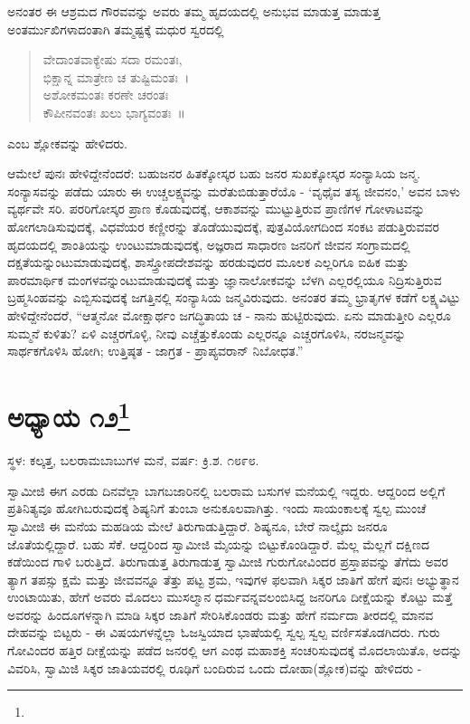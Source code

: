 ಅನಂತರ ಈ ಆಶ್ರಮದ ಗೌರವವನ್ನು ಅವರು ತಮ್ಮ ಹೃದಯದಲ್ಲಿ ಅನುಭವ ಮಾಡುತ್ತ ಮಾಡುತ್ತ ಅಂತರ್ಮುಖಿಗಳಾದಂತಾಗಿ ತಮ್ಮಷ್ಟಕ್ಕೆ ಮಧುರ ಸ್ವರದಲ್ಲಿ

\begin{verse}
ವೇದಾಂತವಾಕ್ಯೇಷು ಸದಾ ರಮಂತಃ,\\ಭಿಕ್ಷಾನ್ನ ಮಾತ್ರೇಣ ಚ ತುಷ್ಟಿಮಂತಃ~।\\ಅಶೋಕಮಂತಃ ಕರಣೇ ಚರಂತಃ\\ಕೌಪೀನವಂತಃ ಖಲು ಭಾಗ್ಯವಂತಃ~॥
\end{verse}

ಎಂಬ ಶ್ಲೋಕವನ್ನು ಹೇಳಿದರು.

ಆಮೇಲೆ ಪುನಃ ಹೇಳಿದ್ದೇನೆಂದರೆ: ಬಹುಜನರ ಹಿತಕ್ಕೋಸ್ಕರ ಬಹು ಜನರ ಸುಖಕ್ಕೋಸ್ಕರ ಸಂನ್ಯಾಸಿಯ ಜನ್ಮ. ಸಂನ್ಯಾಸವನ್ನು ಪಡೆದು ಯಾರು ಈ ಉಚ್ಚಲಕ್ಷ್ಯವನ್ನು ಮರೆತುಬಿಡುತ್ತಾರೆಯೊ - ‘ವೃಥೈವ ತಸ್ಯ ಜೀವನಂ,’ ಅವನ ಬಾಳು ವ್ಯರ್ಥವೇ ಸರಿ. ಪರರಿಗೋಸ್ಕರ ಪ್ರಾಣ ಕೊಡುವುದಕ್ಕೆ, ಆಕಾಶವನ್ನು ಮುಟ್ಟುತ್ತಿರುವ ಪ್ರಾಣಿಗಳ ಗೋಳಾಟವನ್ನು ಹೋಗಲಾಡಿಸುವುದಕ್ಕೆ, ವಿಧವೆಯರ ಕಣ್ಣೀರನ್ನು ತೊಡೆಯುವುದಕ್ಕೆ, ಪುತ್ರವಿಯೋಗದಿಂದ ಸಂಕಟ ಪಡುತ್ತಿರುವವರ ಹೃದಯದಲ್ಲಿ ಶಾಂತಿಯನ್ನು ಉಂಟುಮಾಡುವುದಕ್ಕೆ, ಅಜ್ಞರಾದ ಸಾಧಾರಣ ಜನರಿಗೆ ಜೀವನ ಸಂಗ್ರಾಮದಲ್ಲಿ ದಕ್ಷತೆಯನ್ನುಂಟುಮಾಡುವುದಕ್ಕೆ, ಶಾಸ್ತ್ರೋಪದೇಶವನ್ನು ಹರಡುವುದರ ಮೂಲಕ ಎಲ್ಲರಿಗೂ ಐಹಿಕ ಮತ್ತು ಪಾರಮಾರ್ಥಿಕ ಮಂಗಳವನ್ನುಂಟುಮಾಡುವುದಕ್ಕೆ ಮತ್ತು ಜ್ಞಾನಾಲೋಕವನ್ನು ಬೆಳಗಿ ಎಲ್ಲರಲ್ಲಿಯೂ ನಿದ್ರಿಸುತ್ತಿರುವ ಬ್ರಹ್ಮಸಿಂಹವನ್ನು ಎಬ್ಬಿಸುವುದಕ್ಕೆ ಜಗತ್ತಿನಲ್ಲಿ ಸಂನ್ಯಾಸಿಯ ಜನ್ಮವಿರುವುದು. ಅನಂತರ ತಮ್ಮ ಭ್ರಾತೃಗಳ ಕಡೆಗೆ ಲಕ್ಷ್ಯವಿಟ್ಟು ಹೇಳಿದ್ದೇನೆಂದರೆ, “ಆತ್ಮನೋ ಮೋಕ್ಷಾರ್ಥಂ ಜಗದ್ಧಿತಾಯ ಚ - ನಾನು ಹುಟ್ಟಿರುವುದು. ಏನು ಮಾಡುತ್ತೀರಿ ಎಲ್ಲರೂ ಸುಮ್ಮನೆ ಕುಳಿತು? ಏಳಿ ಎಚ್ಚರಗೊಳ್ಳಿ, ನೀವು ಎಚ್ಚೆತ್ತುಕೊಂಡು ಎಲ್ಲರನ್ನೂ ಎಚ್ಚರಗೊಳಿಸಿ, ನರಜನ್ಮವನ್ನು ಸಾರ್ಥಕಗೊಳಿಸಿ ಹೋಗಿ; ಉತ್ತಿಷ್ಠತ - ಜಾಗ್ರತ - ಪ್ರಾಪ್ಯವರಾನ್ ನಿಬೋಧತ.”

\newpage

\chapter[ಅಧ್ಯಾಯ ೧೨]{ಅಧ್ಯಾಯ ೧೨\protect\footnote{}}

\centerline{ಸ್ಥಳ: ಕಲ್ಕತ್ತ, ಬಲರಾಮಬಾಬುಗಳ ಮನೆ, ವರ್ಷ: ಕ್ರಿ.ಶ. ೧೮೯೮.}

ಸ್ವಾಮೀಜಿ ಈಗ ಎರಡು ದಿನವೆಲ್ಲಾ ಬಾಗಬಜಾರಿನಲ್ಲಿ ಬಲರಾಮ ಬಸುಗಳ ಮನೆಯಲ್ಲಿ ಇದ್ದರು. ಆದ್ದರಿಂದ ಅಲ್ಲಿಗೆ ಪ್ರತಿನಿತ್ಯವೂ ಹೋಗಿಬರುವುದಕ್ಕೆ ಶಿಷ್ಯನಿಗೆ ತುಂಬಾ ಅನುಕೂಲವಾಗಿತ್ತು. ಇಂದು ಸಾಯಂಕಾಲಕ್ಕೆ ಸ್ವಲ್ಪ ಮುಂಚೆ ಸ್ವಾಮೀಜಿ ಈ ಮನೆಯ ಮಹಡಿಯ ಮೇಲೆ ತಿರುಗಾಡುತ್ತಿದ್ದಾರೆ. ಶಿಷ್ಯನೂ, ಬೇರೆ ನಾಲ್ಕೈದು ಜನರೂ ಜೊತೆಯಲ್ಲಿದ್ದಾರೆ. ಬಹು ಸೆಕೆ. ಆದ್ದರಿಂದ ಸ್ವಾಮೀಜಿ ಮೈಯನ್ನು ಬಿಟ್ಟುಕೊಂಡಿದ್ದಾರೆ. ಮೆಲ್ಲ ಮೆಲ್ಲಗೆ ದಕ್ಷಿಣದ ಕಡೆಯಿಂದ ಗಾಳಿ ಬರುತ್ತಿದೆ. ತಿರುಗಾಡುತ್ತ ತಿರುಗಾಡುತ್ತ ಸ್ವಾಮೀಜಿ ಗುರುಗೋವಿಂದರ ಪ್ರಸ್ತಾಪವನ್ನು ತೆಗೆದು ಅವರ ತ್ಯಾಗ ತಪಸ್ಸು ಕ್ಷಮೆ ಮತ್ತು ಜೀವವನ್ನೂ ತೆತ್ತು ಪಟ್ಟ ಶ್ರಮ, ಇವುಗಳ ಫಲವಾಗಿ ಸಿಕ್ಕರ ಜಾತಿಗೆ ಹೇಗೆ ಪುನಃ ಅಭ್ಯುತ್ಥಾನ ಉಂಟಾಯಿತು, ಹೇಗೆ ಅವರು ಮೊದಲು ಮುಸಲ್ಮಾನ ಧರ್ಮವನ್ನವಲಂಬಿಸಿದ್ದ ಜನರಿಗೂ ದೀಕ್ಷೆಯನ್ನು ಕೊಟ್ಟು ಮತ್ತೆ ಅವರನ್ನು ಹಿಂದೂಗಳನ್ನಾಗಿ ಮಾಡಿ ಸಿಕ್ಕರ ಜಾತಿಗೆ ಸೇರಿಸಿಕೊಂಡರು ಮತ್ತು ಹೇಗೆ ನರ್ಮದಾ ತೀರದಲ್ಲಿ ಮಾನವ ದೇಹವನ್ನು ಬಿಟ್ಟರು - ಈ ವಿಷಯಗಳನ್ನೆಲ್ಲಾ ಓಜಸ್ವಿಯಾದ ಭಾಷೆಯಲ್ಲಿ ಸ್ವಲ್ಪ ಸ್ವಲ್ಪ ವರ್ಣಿಸತೊಡಗಿದರು. ಗುರು ಗೋವಿಂದರ ಹತ್ತಿರ ದೀಕ್ಷೆಯನ್ನು ಪಡೆದ ಜನರಲ್ಲಿ ಆಗ ಎಂಥ ಮಹಾಶಕ್ತಿ ಸಂಚರಿಸುವುದಕ್ಕೆ ಮೊದಲಾಯಿತೊ, ಅದನ್ನು ವಿವರಿಸಿ, ಸ್ವಾಮಿಜಿ ಸಿಕ್ಕರ ಜಾತಿಯವರಲ್ಲಿ ರೂಢಿಗೆ ಬಂದಿರುವ ಒಂದು ದೋಹಾ(ಶ್ಲೋಕ)ವನ್ನು ಹೇಳಿದರು -

